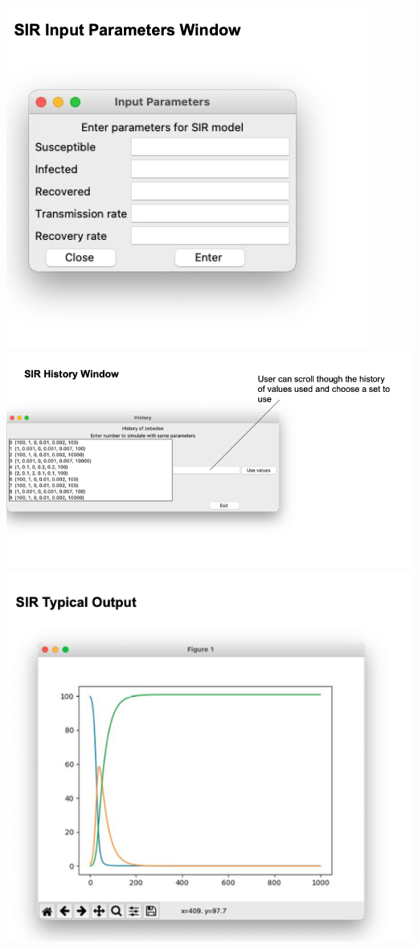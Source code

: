 \documentclass[11pt, a4paper]{article}
\begin{document}
\includegraphics[width=\textwidth]{a_sir_input.png}
\includegraphics[width=\textwidth]{a_sir_history.png}
\includegraphics[width=\textwidth]{a_sir_output.png}
\end{document}
